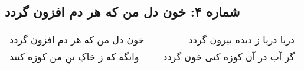 \begin{center}
\section*{شماره ۴: خون دل من که هر دم افزون گردد}
\label{sec:004}
\begin{longtable}{l p{0.5cm} r}
خون دل من که هر دم افزون گردد
&&
دریا دریا ز دیده بیرون گردد
\\
وانگه که ز خاکِ تنِ من کوزه کنند
&&
گر آب در آن کوزه کنی خون گردد
\\
\end{longtable}
\end{center}
